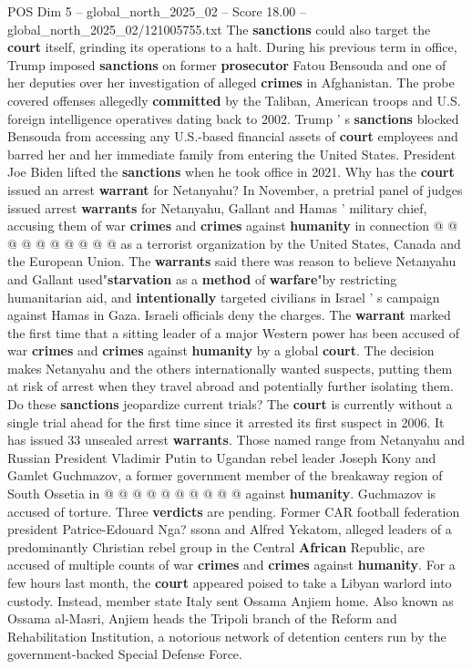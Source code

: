 \begin{textsample}{POS Dim 5 – global\_north\_2025\_02 – Score 18.00 – global\_north\_2025\_02/121005755.txt}
The \textbf{sanctions} could also target the \textbf{court} itself, grinding its operations to a halt.
During his previous term in office, Trump imposed \textbf{sanctions} on former \textbf{prosecutor} Fatou Bensouda and one of her deputies over her investigation of alleged \textbf{crimes} in Afghanistan.
The probe covered offenses allegedly \textbf{committed} by the Taliban, American troops and U.S. foreign intelligence operatives dating back to 2002.
Trump ' s \textbf{sanctions} blocked Bensouda from accessing any U.S.-based financial assets of \textbf{court} employees and barred her and her immediate family from entering the United States.
President Joe Biden lifted the \textbf{sanctions} when he took office in 2021.
Why has the \textbf{court} issued an arrest \textbf{warrant} for Netanyahu?
In November, a pretrial panel of judges issued arrest \textbf{warrants} for Netanyahu, Gallant and Hamas ' military chief, accusing them of war \textbf{crimes} and \textbf{crimes} against \textbf{humanity} in connection @ @ @ @ @ @ @ @ @ @ as a terrorist organization by the United States, Canada and the European Union.
The \textbf{warrants} said there was reason to believe Netanyahu and Gallant used"\textbf{starvation} as a \textbf{method} of \textbf{warfare}"by restricting humanitarian aid, and \textbf{intentionally} targeted civilians in Israel ' s campaign against Hamas in Gaza.
Israeli officials deny the charges.
The \textbf{warrant} marked the first time that a sitting leader of a major Western power has been accused of war \textbf{crimes} and \textbf{crimes} against \textbf{humanity} by a global \textbf{court}.
The decision makes Netanyahu and the others internationally wanted suspects, putting them at risk of arrest when they travel abroad and potentially further isolating them.
Do these \textbf{sanctions} jeopardize current trials?
The \textbf{court} is currently without a single trial ahead for the first time since it arrested its first suspect in 2006.
It has issued 33 unsealed arrest \textbf{warrants}.
Those named range from Netanyahu and Russian President Vladimir Putin to Ugandan rebel leader Joseph Kony and Gamlet Guchmazov, a former government member of the breakaway region of South Ossetia in @ @ @ @ @ @ @ @ @ @ against \textbf{humanity}.
Guchmazov is accused of torture.
Three \textbf{verdicts} are pending.
Former CAR football federation president Patrice-Edouard Nga? ssona and Alfred Yekatom, alleged leaders of a predominantly Christian rebel group in the Central \textbf{African} Republic, are accused of multiple counts of war \textbf{crimes} and \textbf{crimes} against \textbf{humanity}.
For a few hours last month, the \textbf{court} appeared poised to take a Libyan warlord into custody.
Instead, member state Italy sent Ossama Anjiem home.
Also known as Ossama al-Masri, Anjiem heads the Tripoli branch of the Reform and Rehabilitation Institution, a notorious network of detention centers run by the government-backed Special Defense Force.

\end{textsample}
